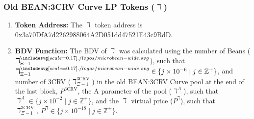 \documentclass[class=article, crop=false]{standalone}
\begin{document}
\newpage
\subsubsection{Old BEAN:3CRV Curve LP Tokens ($\daleth$)}
    \begin{enumerate}
        \item \textbf{Token Address:} The $\daleth$ token address is 0x3a70DfA7d2262988064A2D051dd47521E43c9BdD.
        \item \textbf{BDV Function:} The BDV of $\daleth$ was calculated using the number of Beans ($\daleth_{\Xi-1}^{\bean}$), such that $\daleth_{\Xi-1}^{\bean} \in \{j \times 10^{-6} \mid j \in \mathbb{Z}^{+} \}$, and number of 3CRV ($\daleth_{\Xi-1}^{\text{3CRV}}$) in the old BEAN:3CRV Curve pool at the end of the last block, $P^{\text{3CRV}}$, the A parameter of the pool ($\daleth^{A}$), such that $\daleth^{A} \in \{j \times 10^{-2} \mid j \in \mathbb{Z}^{+} \}$, and the $\daleth$ virtual price ($P^{\daleth}$), such that $\daleth_{\Xi-1}^{\text{3CRV}},\ P^{\daleth} \in \{j \times 10^{-18} \mid j \in \mathbb{Z}^{+} \}$. 


\end{enumerate}
\end{document}
